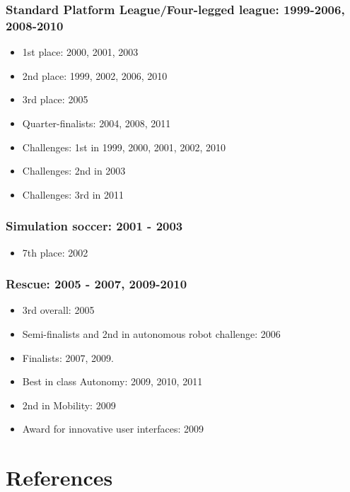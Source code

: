\documentclass[runningheads,a4paper]{llncs}
\begin{document}
\subsubsection{Standard Platform League/Four-legged league: 1999-2006, 2008-2010}
\begin{itemize}
\item 1st place: 2000, 2001, 2003
\item 2nd place: 1999, 2002, 2006, 2010
\item 3rd place: 2005
\item Quarter-finalists: 2004, 2008, 2011
\item Challenges: 1st in 1999, 2000, 2001, 2002, 2010
\item Challenges: 2nd in 2003
\item Challenges: 3rd in 2011
\end{itemize}

\subsubsection{Simulation soccer: 2001 - 2003}
\begin{itemize}
\item 7th place: 2002
\end{itemize}

\subsubsection{Rescue: 2005 - 2007, 2009-2010}
\begin{itemize}
\item 3rd overall: 2005
\item Semi-finalists and 2nd in autonomous robot challenge: 2006
\item Finalists: 2007, 2009. 
\item Best in class Autonomy: 2009, 2010, 2011 
\item 2nd in Mobility: 2009
\item Award for innovative user interfaces: 2009
\end{itemize}

\section*{References}
\end{document}
